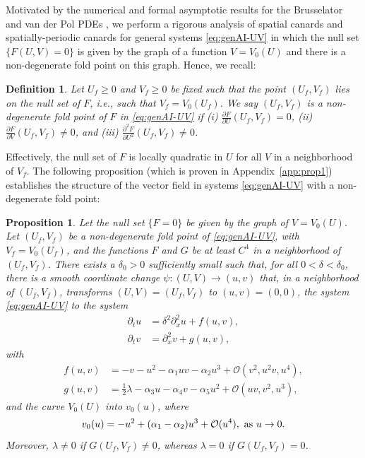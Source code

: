 \documentclass[11pt]{article}
\numberwithin{equation}{section}
\newtheorem{proposition}{Proposition}[section]
\newtheorem{definition}{Definition}[section]
\begin{document}
Motivated by the numerical and formal asymptotic results for the Brusselator and van der Pol PDEs \cite{JDKV2026,VDK2025}, we perform a rigorous analysis of spatial canards and spatially-periodic canards for general systems \eqref{eq:genAI-UV} in which the null set $\{ F(U,V) = 0 \}$ is given by the graph of a function $V=V_0(U)$ and there is a non-degenerate fold point on this graph.
Hence, we recall:
\begin{definition}
Let $U_f\ge 0$ and $V_f\ge 0$ be fixed such that the point $(U_f,V_f)$ lies on the null set of $F$, {\it i.e.}, such that $V_f=V_0(U_f)$. 
We say $(U_f,V_f)$ is a non-degenerate fold point of $F$ in \eqref{eq:genAI-UV} if 
(i) $\frac{\partial F}{\partial U}(U_f,V_f)=0$,
(ii) $\frac{\partial F}{\partial V}(U_f,V_f) \ne 0$, and 
(iii) $\frac{\partial^2 F}{\partial U^2}(U_f,V_f) \ne 0$.
\end{definition}
%
\noindent 
Effectively, the null set of $F$ is locally quadratic in $U$ for all $V$ in a neighborhood of $V_f$.
The following proposition (which is proven in Appendix~\ref{app:prop1}) establishes the structure of the vector field in systems \eqref{eq:genAI-UV} with a non-degenerate fold point:
%
\begin{proposition} \label{prop1}
   Let the null set $\{ F=0 \}$ be given by the graph of $V=V_0(U)$.
   Let $(U_f,V_f)$ be a non-degenerate fold point of \eqref{eq:genAI-UV},
   with $V_f=V_0(U_f)$, and the functions $F$ and $G$ be at least $C^4$ in a neighborhood of $(U_f,V_f)$.   
   There exists a $\delta_0>0$ sufficiently small such that, for all $0< \delta < \delta_0$, there is a smooth coordinate change $\psi: (U,V) \to (u,v)$ that, in a neighborhood of $(U_f,V_f)$,
   transforms $(U,V)=(U_f,V_f)$ to $(u,v)=(0,0)$, the system \eqref{eq:genAI-UV} to the system
\begin{equation}  \label{eq:genAI}
\begin{split}
    \partial_{t}u &= \delta^2 \partial^2_x u + f(u,v), \\
    \partial_{t}v &= \partial^2_x v + g(u,v),
\end{split}
\end{equation}
with
\begin{equation}\label{eq:fg} 
\begin{split} 
f(u,v) &= - v - u^2 - \alpha_1 u v - \alpha_2 u^3 +\mathcal{O}(v^2,u^2v,u^4),\\
    g(u,v) &= \frac{1}{2}\lambda - \alpha_3 u - \alpha_4 v - \alpha_5 u^2 + \mathcal{O}(uv,v^2,u^3),
    \end{split} 
\end{equation}
and the curve $V_0(U)$ into $v_0(u)$, where
\begin{equation}\label{eq:v0}
v_0(u) = -u^2 + (\alpha_1-\alpha_2) u^3 + \mathcal{O}(u^4), \, \, {\rm as}  \, \, u \to 0.
\end{equation}
Moreover, $\lambda\ne 0$ if $G(U_f,V_f) \ne 0$, whereas $\lambda=0$ if $G(U_f,V_f)=0$.
\end{proposition}
\end{document}
